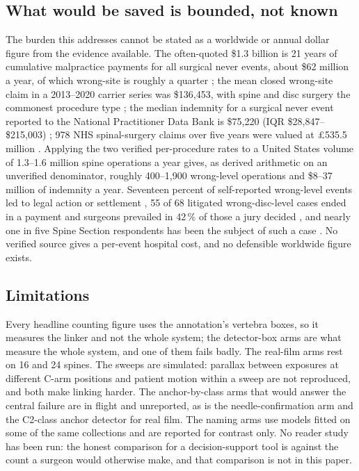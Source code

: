 \documentclass[11pt,letterpaper]{article}
\begin{document}
\subsection*{What would be saved is bounded, not known}
The burden this addresses cannot be stated as a worldwide or annual dollar figure from the evidence
available. The often-quoted \$1.3 billion is 21 years of cumulative malpractice payments for all surgical
never events, about \$62 million a year, of which wrong-site is roughly a quarter \citep{mehtsun2013}; the
mean closed wrong-site claim in a 2013--2020 carrier series was \$136{,}453, with spine and disc surgery
the commonest procedure type \citep{tan2023}; the median indemnity for a surgical never event reported to
the National Practitioner Data Bank is \$75{,}220 (IQR \$28{,}847--\$215{,}003) \citep{bettis2026}; 978 NHS
spinal-surgery claims over five years were valued at \pounds535.5 million \citep{machin2018}. Applying the
two verified per-procedure rates to a United States volume of 1.3--1.6 million spine operations a year
gives, as derived arithmetic on an unverified denominator, roughly 400--1{,}900 wrong-level operations and
\$8--37 million of indemnity a year. Seventeen percent of self-reported wrong-level events led to legal
action or settlement \citep{mody2008}, 55 of 68 litigated wrong-disc-level cases ended in a payment and
surgeons prevailed in 42\,\% of those a jury decided \citep{goodkin2004}, and nearly one in five Spine
Section respondents has been the subject of such a case \citep{groff2013}. No verified source gives a
per-event hospital cost, and no defensible worldwide figure exists.

\subsection*{Limitations}
Every headline counting figure uses the annotation's vertebra boxes, so it measures the linker and not the
whole system; the detector-box arms are what measure the whole system, and one of them fails badly. The
real-film arms rest on 16 and 24 spines. The sweeps are simulated: parallax between exposures at different
C-arm positions and patient motion within a sweep are not reproduced, and both make linking harder. The
anchor-by-class arms that would answer the central failure are in flight and unreported, as is the
needle-confirmation arm and the C2-class anchor detector for real film. The naming arms use models fitted
on some of the same collections and are reported for contrast only. No reader study has been run: the
honest comparison for a decision-support tool is against the count a surgeon would otherwise make, and that
comparison is not in this paper.
\end{document}
